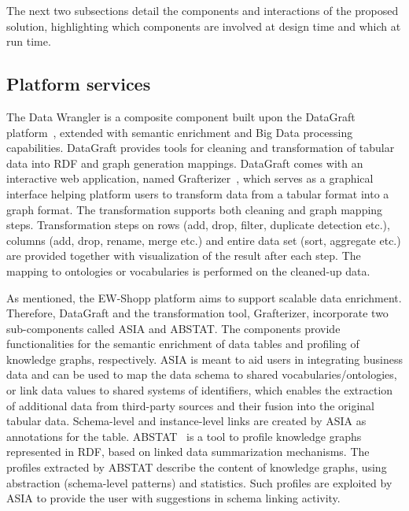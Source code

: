 The next two subsections detail the components and interactions of the proposed solution, highlighting which components are involved at design time and which at run time. 


\subsection{Platform services}

The Data Wrangler is a composite component built upon the DataGraft platform~\cite{roman2016datagraft}, extended with semantic enrichment and Big Data processing capabilities. DataGraft provides tools for cleaning and transformation of tabular data into RDF and graph generation mappings.
DataGraft comes with an interactive web application, named Grafterizer~\cite{sukhobok2016tabular}, which serves as a graphical interface helping platform users to transform data from a tabular format into a graph format. The transformation supports both cleaning and graph mapping steps. Transformation steps on rows (add, drop, filter, duplicate detection etc.), columns (add, drop, rename, merge etc.) and entire data set (sort, aggregate etc.) are provided together with visualization of the result after each step. The mapping to ontologies or vocabularies is performed on the cleaned-up data. 

As mentioned, the EW-Shopp platform aims to support scalable data enrichment. Therefore, DataGraft and the transformation tool, Grafterizer, incorporate two sub-components called ASIA and ABSTAT. The components provide functionalities for the semantic enrichment of data tables and profiling of knowledge graphs, respectively. ASIA is meant to aid users in integrating business data and can be used to map the data schema to shared vocabularies/ontologies, or link data values to shared systems of identifiers, which enables the extraction of additional data from third-party sources and their fusion into the original tabular data. Schema-level and instance-level links are created by ASIA as annotations for the table. ABSTAT~\cite{palmonari2015abstat} is a tool to profile knowledge graphs represented in RDF, based on linked data summarization mechanisms. The profiles extracted by ABSTAT describe the content of knowledge graphs, using abstraction (schema-level patterns) and statistics. Such profiles are exploited by ASIA to provide the user with suggestions in schema linking activity. 

 